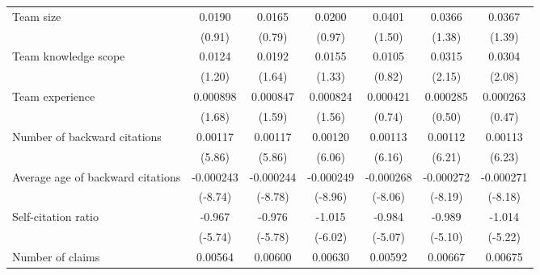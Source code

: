 \begin{sidewaystable}[htbp]
{\begin{tabular}{l*{6}{c}}
\addlinespace
Team size           &      0.0190         &      0.0165         &      0.0200         &      0.0401         &      0.0366         &      0.0367         \\
                    &      (0.91)         &      (0.79)         &      (0.97)         &      (1.50)         &      (1.38)         &      (1.39)         \\
\addlinespace
Team knowledge scope&      0.0124         &      0.0192         &      0.0155         &      0.0105         &      0.0315\sym{*}  &      0.0304\sym{*}  \\
                    &      (1.20)         &      (1.64)         &      (1.33)         &      (0.82)         &      (2.15)         &      (2.08)         \\
\addlinespace
Team experience     &    0.000898\sym{+}  &    0.000847         &    0.000824         &    0.000421         &    0.000285         &    0.000263         \\
                    &      (1.68)         &      (1.59)         &      (1.56)         &      (0.74)         &      (0.50)         &      (0.47)         \\
\addlinespace
Number of backward citations&     0.00117\sym{***}&     0.00117\sym{***}&     0.00120\sym{***}&     0.00113\sym{***}&     0.00112\sym{***}&     0.00113\sym{***}\\
                    &      (5.86)         &      (5.86)         &      (6.06)         &      (6.16)         &      (6.21)         &      (6.23)         \\
\addlinespace
Average age of backward citations&   -0.000243\sym{***}&   -0.000244\sym{***}&   -0.000249\sym{***}&   -0.000268\sym{***}&   -0.000272\sym{***}&   -0.000271\sym{***}\\
                    &     (-8.74)         &     (-8.78)         &     (-8.96)         &     (-8.06)         &     (-8.19)         &     (-8.18)         \\
\addlinespace
Self-citation ratio &      -0.967\sym{***}&      -0.976\sym{***}&      -1.015\sym{***}&      -0.984\sym{***}&      -0.989\sym{***}&      -1.014\sym{***}\\
                    &     (-5.74)         &     (-5.78)         &     (-6.02)         &     (-5.07)         &     (-5.10)         &     (-5.22)         \\
\addlinespace
Number of claims    &     0.00564         &     0.00600\sym{+}  &     0.00630\sym{+}  &     0.00592         &     0.00667\sym{+}  &     0.00675\sym{+}  \\

\end{tabular}}
\end{sidewaystable}
